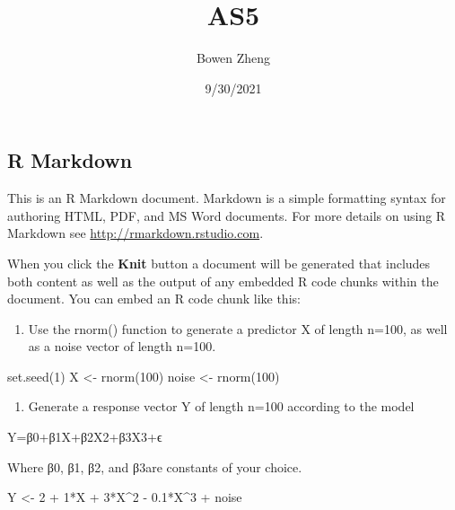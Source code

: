 \documentclass[
]{article}
\title{AS5}
\author{Bowen Zheng}
\date{9/30/2021}
\newenvironment{Shaded}{\begin{snugshade}}{\end{snugshade}}
\newcommand{\DecValTok}[1]{\textcolor[rgb]{0.00,0.00,0.81}{#1}}
\newcommand{\FloatTok}[1]{\textcolor[rgb]{0.00,0.00,0.81}{#1}}
\newcommand{\FunctionTok}[1]{\textcolor[rgb]{0.00,0.00,0.00}{#1}}
\newcommand{\NormalTok}[1]{#1}
\newcommand{\OtherTok}[1]{\textcolor[rgb]{0.56,0.35,0.01}{#1}}
\newcommand{\SpecialCharTok}[1]{\textcolor[rgb]{0.00,0.00,0.00}{#1}}
\providecommand{\tightlist}{%
  \setlength{\itemsep}{0pt}\setlength{\parskip}{0pt}}
\begin{document}
\maketitle

\hypertarget{r-markdown}{%
\subsection{R Markdown}\label{r-markdown}}

This is an R Markdown document. Markdown is a simple formatting syntax
for authoring HTML, PDF, and MS Word documents. For more details on
using R Markdown see \url{http://rmarkdown.rstudio.com}.

When you click the \textbf{Knit} button a document will be generated
that includes both content as well as the output of any embedded R code
chunks within the document. You can embed an R code chunk like this:

\begin{enumerate}
\def\labelenumi{(\alph{enumi})}
\tightlist
\item
  Use the rnorm() function to generate a predictor X of length n=100, as
  well as a noise vector of length n=100.
\end{enumerate}

\begin{Shaded}
\begin{Highlighting}[]
\FunctionTok{set.seed}\NormalTok{(}\DecValTok{1}\NormalTok{)}
\NormalTok{X }\OtherTok{\textless{}{-}} \FunctionTok{rnorm}\NormalTok{(}\DecValTok{100}\NormalTok{)}
\NormalTok{noise }\OtherTok{\textless{}{-}} \FunctionTok{rnorm}\NormalTok{(}\DecValTok{100}\NormalTok{)}
\end{Highlighting}
\end{Shaded}

\begin{enumerate}
\def\labelenumi{(\alph{enumi})}
\setcounter{enumi}{1}
\tightlist
\item
  Generate a response vector Y of length n=100 according to the model
\end{enumerate}

Y=β0+β1X+β2X2+β3X3+ϵ

Where β0, β1, β2, and β3are constants of your choice.

\begin{Shaded}
\begin{Highlighting}[]
\NormalTok{Y }\OtherTok{\textless{}{-}} \DecValTok{2} \SpecialCharTok{+} \DecValTok{1}\SpecialCharTok{*}\NormalTok{X }\SpecialCharTok{+} \DecValTok{3}\SpecialCharTok{*}\NormalTok{X}\SpecialCharTok{\^{}}\DecValTok{2} \SpecialCharTok{{-}} \FloatTok{0.1}\SpecialCharTok{*}\NormalTok{X}\SpecialCharTok{\^{}}\DecValTok{3} \SpecialCharTok{+}\NormalTok{ noise}
\end{Highlighting}
\end{Shaded}
\end{document}
